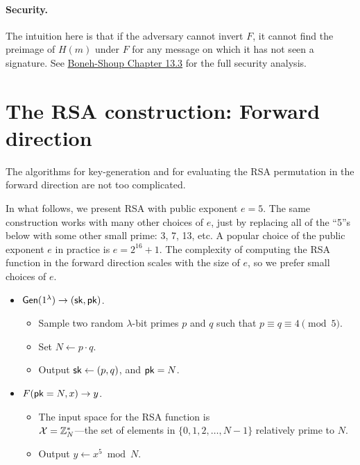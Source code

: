 \paragraph{Security.}
The intuition here is that if the adversary cannot invert $F$,
it cannot find the preimage of $H(m)$ under $F$ for any message
on which it has not seen a signature.
See \href{https://toc.cryptobook.us/book.pdf#page=550}{Boneh-Shoup Chapter 13.3}
for the full security analysis.

\section{The RSA construction: Forward direction}

The algorithms for 
key-generation and 
for evaluating the RSA permutation
in the forward direction are not too complicated.

In what follows, we present RSA with 
public exponent $e=5$.
The same construction works with many other choices of $e$,
just by replacing all of the ``5''s below with some other
small prime: 3, 7, 13, etc.
A popular choice of the public exponent $e$ in practice is $e=2^{16}+1$.
The complexity of computing the RSA function in the forward
direction scales with the size of $e$, so we prefer small
choices of $e$.

\begin{itemize}
  \item $\mathsf{Gen}(1^\lambda) \to ({\mathsf{sk}}, \mathsf{pk})$.
  \begin{itemize}
    \item Sample two random $\lambda$-bit primes $p$ and $q$
      such that $p \equiv q \equiv 4 \pmod 5$.
    \item Set $N \gets p \cdot q$.
    \item Output ${\mathsf{sk}} \gets (p, q)$, and $\mathsf{pk} = N$.
  \end{itemize}
  \item $F(\mathsf{pk} = N, x) \to y$.
\begin{itemize}
  \item The input space for the RSA function is \\
    $\mathcal{X} = \mathbb{Z}^*_N$---the set of elements in $\{0, 1, 2, \dots, N-1\}$
    relatively prime to $N$.
    \item Output $y \gets x^5 \bmod N$.
\end{itemize}
\end{itemize}

